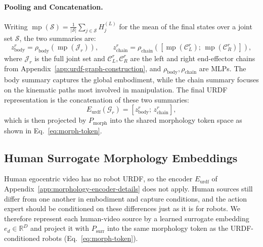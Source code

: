 \paragraph{Pooling and Concatenation.}
Writing $\operatorname{mp}(\mathcal{S}) = \frac{1}{|\mathcal{S}|}\sum_{j \in \mathcal{S}} H^{(L)}_j$ for the mean of the final states over a joint set $\mathcal{S}$, the two summaries are:
\begin{equation}
    z_{\mathrm{body}}^{r} = \rho_{\mathrm{body}}\!\left(\operatorname{mp}(\mathcal{J}_r)\right),
    \qquad
    z_{\mathrm{chain}}^{r} = \rho_{\mathrm{chain}}\!\left(\left[\operatorname{mp}(\mathcal{C}^{r}_{L});\,\operatorname{mp}(\mathcal{C}^{r}_{R})\right]\right),
\end{equation}
where $\mathcal{J}_r$ is the full joint set and $\mathcal{C}^{r}_{L}, \mathcal{C}^{r}_{R}$ are the left and right end-effector chains from Appendix~\ref{app:urdf-graph-construction}, and $\rho_{\mathrm{body}}, \rho_{\mathrm{chain}}$ are MLPs. The body summary captures the global embodiment, while the chain summary focuses on the kinematic paths most involved in manipulation. The final URDF representation is the concatenation of these two summaries:
\begin{equation}
E_{\mathrm{urdf}}(\mathcal{G}_r) = \left[ z_{\mathrm{body}}^{r};\, z_{\mathrm{chain}}^{r} \right],
\end{equation}
which is then projected by $P_{\mathrm{morph}}$ into the shared morphology token space as shown in Eq.~\ref{eq:morph-token}.


\subsection{Human Surrogate Morphology Embeddings}
\label{app:human-surrogate-details}

Human egocentric video has no robot URDF, so the encoder $E_{\mathrm{urdf}}$ of Appendix~\ref{app:morphology-encoder-details} does not apply. Human sources still differ from one another in embodiment and capture conditions, and the action expert should be conditioned on these differences just as it is for robots. We therefore represent each human-video source by a learned surrogate embedding $e_{d} \in \mathbb{R}^{D}$ and project it with $P_{\mathrm{surr}}$ into the same morphology token as the URDF-conditioned robots (Eq.~\ref{eq:morph-token}).

